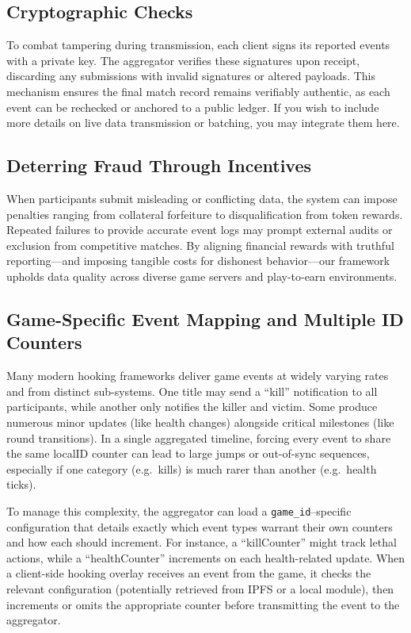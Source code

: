 \documentclass[11pt]{article}
\begin{document}
\subsection{Cryptographic Checks}
\label{sec:cryptoChecks}
To combat tampering during transmission, each client signs its reported events with a 
private key. The aggregator verifies these signatures upon receipt, discarding any 
submissions with invalid signatures or altered payloads. This mechanism ensures the 
final match record remains verifiably authentic, as each event can be rechecked or 
anchored to a public ledger. If you wish to include more details on live data 
transmission or batching, you may integrate them here.

\subsection{Deterring Fraud Through Incentives}
When participants submit misleading or conflicting data, the system can impose penalties 
ranging from collateral forfeiture to disqualification from token rewards. Repeated 
failures to provide accurate event logs may prompt external audits or exclusion from 
competitive matches. By aligning financial rewards with truthful reporting—and imposing 
tangible costs for dishonest behavior—our framework upholds data quality across diverse 
game servers and play-to-earn environments.




\subsection{Game-Specific Event Mapping and Multiple ID Counters}
\label{sec:gameSpecificConfigs}

Many modern hooking frameworks deliver game events at widely varying rates and from distinct sub-systems. One title may send a “kill” notification to all participants, while another only notifies the killer and victim. Some produce numerous minor updates (like health changes) alongside critical milestones (like round transitions). In a single aggregated timeline, forcing every event to share the same localID counter can lead to large jumps or out-of-sync sequences, especially if one category (e.g.\ kills) is much rarer than another (e.g.\ health ticks). 

To manage this complexity, the aggregator can load a \texttt{game\_id}--specific configuration that details exactly which event types warrant their own counters and how each should increment. For instance, a “killCounter” might track lethal actions, while a “healthCounter” increments on each health-related update. When a client-side hooking overlay receives an event from the game, it checks the relevant configuration (potentially retrieved from IPFS\cite{ipfs} or a local module), then increments or omits the appropriate counter before transmitting the event to the aggregator. 
\end{document}
